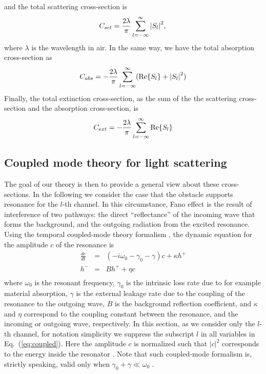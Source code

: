 \documentclass[preprint,aps]{revtex4}
\begin{document}
and the total scattering cross-section is
\begin{equation}
\label{eq:cross-section}
 {C_{sct}} = \frac{{2\lambda }}{\pi }\sum\limits_{l =  - \infty }^\infty  {{{\left| {{S_l}} \right|}^2}},  \\
\end{equation}
where $\lambda$ is the wavelength in air. In the same way, we have
the total absorption cross-section as
\begin{equation}
\label{eq:abs-cross-section} {C_{abs}} = - \frac{{2\lambda }}{\pi
}\sum\limits_{l =  - \infty }^\infty  ({  {\mathop{\rm Re}\nolimits}
\{ {S_l}\} }  + {\left| {{S_l}} \right|^2})\end{equation} Finally,
the total extinction cross-section, as the sum of the the scattering
cross-section and the  absorption cross-section,  is
\begin{equation}
\label{eq:cross-section2}
 {C_{ext}} =  - \frac{{2\lambda }}{\pi }\sum\limits_{l =  - \infty }^\infty  {{\mathop{\rm Re}\nolimits} \{ {S_l}\} }
\end{equation}



\subsection{Coupled mode theory for light scattering}

The goal of our theory is then to provide a general view about these
cross-sections. In the following we consider the case that the
obstacle supports resonance for the $l$-th channel. In this
circumstance, Fano effect is the result of interference of two
pathways: the direct ``reflectance'' of the incoming wave that forms
the background, and the outgoing radiation from the excited
resonance. Using  the temporal coupled-mode theory formalism
\cite{fan2003temporal,hamam2007coupled,haus1984waves}, the dynamic
equation for the amplitude $c$ of the resonance is
\begin{equation}
\label{eq:coupled}
\begin{array}{*{20}{l}}
 \frac{{dc}}{{dt}} & = & \left( { - i{\omega _0} - \gamma_0 - \gamma } \right)c + \kappa h^ +  \\
 {h}^ -  & = & {B}h^+  + \eta c \\
 \end{array}
\end{equation}
where $\omega_0$ is the resonant frequency, $\gamma_0$ is the
intrinsic loss rate due to for example material absorption, $\gamma$
is the external leakage rate due to the coupling of the resonance to
the outgoing wave, ${B}$ is the background reflection coefficient,
and $\kappa$ and $\eta$ correspond to the coupling constant between
the resonance, and the incoming or outgoing wave, respectively. In
this section, as we consider only the $l$-th channel, for notation
simplicity we suppress the subscript $l$ in all variables in
Eq.~(\ref{eq:coupled}). Here the amplitude $c$ is normalized such
that ${\left| c \right|^2}$ corresponds to the energy inside the
resonator \cite{haus1984waves}. Note that such coupled-mode
formalism is, strictly speaking, valid only when ${\gamma _0} +
\gamma \ll {\omega _0}$ \cite{haus1984waves}.
\end{document}
